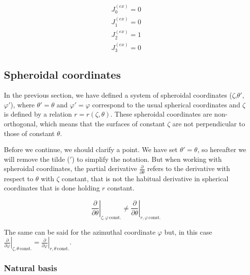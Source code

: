 \begin{equation}
\begin{array}{l}
J_0^{(ex)}=0\\
J_1^{(ex)}=0\\
J_2^{(ex)}=1\\
J_3^{(ex)}=0
\end{array}
\end{equation}

\subsection{Spheroidal coordinates}

In the previous section, we have defined a system of spheroidal
coordinates ($\zeta$,$\theta'$,$\varphi'$), where $\theta'=\theta$ and
$\varphi'=\varphi$ correspond to the usual spherical coordinates and
$\zeta$ is defined by a relation $r=r(\zeta,\theta)$. These spheroidal
coordinates are non-orthogonal, which means that the surfaces of constant
$\zeta$ are not perpendicular to those of constant $\theta$.

Before we continue, we should clarify a point. We have set
$\theta'=\theta$, so hereafter we will remove the tilde ($'$) to simplify
the notation. But when working with spheroidal coordinates, the partial
derivative $\frac{\partial}{\partial\theta}$ refers to the derivative
with respect to $\theta$ with $\zeta$ constant, that is not the habitual
derivative in spherical coordinates that is done holding $r$ constant.

$$\left.\frac{\partial}{\partial\theta}\right|_{\zeta,\varphi\,\mathrm{const.}}\ne
\left.\frac{\partial}{\partial\theta}\right|_{r,\varphi\,\mathrm{const.}}$$

The same can be said for the azimuthal coordinate $\varphi$ but, in this case
$\left.\frac{\partial}{\partial\varphi}\right|_{\zeta,\theta\,\mathrm{const.}}=
\left.\frac{\partial}{\partial\varphi}\right|_{r,\theta\,\mathrm{const.}}$.

\subsubsection{Natural basis}

